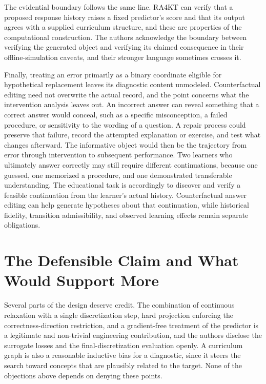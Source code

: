 \documentclass[11pt]{article}
\begin{document}
The evidential boundary follows the same line. RA4KT can verify that a proposed response history raises a fixed predictor's score and that its output agrees with a supplied curriculum structure, and these are properties of the computational construction. The authors acknowledge the boundary between verifying the generated object and verifying its claimed consequence in their offline-simulation caveats, and their stronger language sometimes crosses it.

Finally, treating an error primarily as a binary coordinate eligible for hypothetical replacement leaves its diagnostic content unmodeled. Counterfactual editing need not overwrite the actual record, and the point concerns what the intervention analysis leaves out. An incorrect answer can reveal something that a correct answer would conceal, such as a specific misconception, a failed procedure, or sensitivity to the wording of a question. A repair process could preserve that failure, record the attempted explanation or exercise, and test what changes afterward. The informative object would then be the trajectory from error through intervention to subsequent performance. Two learners who ultimately answer correctly may still require different continuations, because one guessed, one memorized a procedure, and one demonstrated transferable understanding. The educational task is accordingly to discover and verify a feasible continuation from the learner's actual history. Counterfactual answer editing can help generate hypotheses about that continuation, while historical fidelity, transition admissibility, and observed learning effects remain separate obligations.

\section{The Defensible Claim and What Would Support More}\label{sec:defensible}

Several parts of the design deserve credit. The combination of continuous relaxation with a single discretization step, hard projection enforcing the correctness-direction restriction, and a gradient-free treatment of the predictor is a legitimate and non-trivial engineering contribution, and the authors disclose the surrogate losses and the final-discretization evaluation openly. A curriculum graph is also a reasonable inductive bias for a diagnostic, since it steers the search toward concepts that are plausibly related to the target. None of the objections above depends on denying these points.
\end{document}
